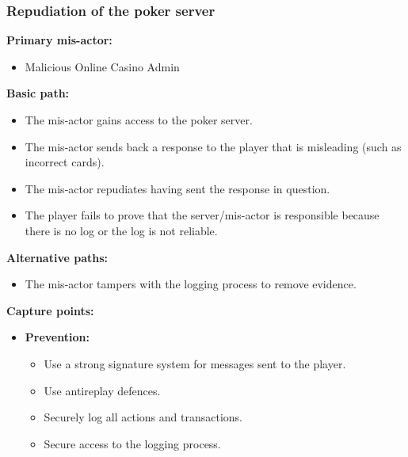 \documentclass[a4paper,11pt]{report}
\begin{document}
\subsubsection{Repudiation of the poker server}
\label{PokerServerCasesR}
\textbf{Primary mis-actor:}
\begin{itemize}
\item Malicious Online Casino Admin
\end{itemize}
\textbf{Basic path:}
\begin{itemize}
\item The mis-actor gains access to the poker server.
\item The mis-actor sends back a response to the player that is misleading (such as incorrect cards).
\item The mis-actor repudiates having sent the response in question.
\item The player fails to prove that the server/mis-actor is responsible because there is no log or the log is not reliable.
\end{itemize}
\textbf{Alternative paths:}
\begin{itemize}
\item The mis-actor tampers with the logging process to remove evidence.
\end{itemize}
\textbf{Capture points:}
\begin{itemize}
\item \textbf{Prevention:}
\begin{itemize}
\item Use a strong signature system for messages sent to the player.
\item Use antireplay defences.
\item Securely log all actions and transactions.
\item Secure access to the logging process.
\end{itemize}
\end{itemize}
\end{document}
